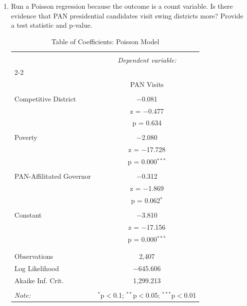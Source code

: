 \documentclass[12pt,letterpaper]{article}
\begin{document}
\begin{enumerate}
	\item [(a)]
	Run a Poisson regression because the outcome is a count variable. Is there evidence that PAN presidential candidates visit swing districts more? Provide a test statistic and p-value.
	
	
	
\begin{table}[!htbp] \centering 
	\caption{Table of Coefficients: Poisson Model} 
	\label{} 
	\begin{tabular}{@{\extracolsep{5pt}}lc} 
		\\[-1.8ex]\hline 
		\hline \\[-1.8ex] 
		& \multicolumn{1}{c}{\textit{Dependent variable:}} \\ 
		\cline{2-2} 
		\\[-1.8ex] & PAN Visits \\ 
		\hline \\[-1.8ex] 
		Competitive District & $-$0.081 \\ 
		& z = $-$0.477 \\ 
		& p = 0.634 \\ 
		& \\ 
		Poverty & $-$2.080 \\ 
		& z = $-$17.728 \\ 
		& p = 0.000$^{***}$ \\ 
		& \\ 
		PAN-Affilitated Governor & $-$0.312 \\ 
		& z = $-$1.869 \\ 
		& p = 0.062$^{*}$ \\ 
		& \\ 
		Constant & $-$3.810 \\ 
		& z = $-$17.156 \\ 
		& p = 0.000$^{***}$ \\ 
		& \\ 
		\hline \\[-1.8ex] 
		Observations & 2,407 \\ 
		Log Likelihood & $-$645.606 \\ 
		Akaike Inf. Crit. & 1,299.213 \\ 
		\hline 
		\hline \\[-1.8ex] 
		\textit{Note:}  & \multicolumn{1}{r}{$^{*}$p$<$0.1; $^{**}$p$<$0.05; $^{***}$p$<$0.01} \\ 
	\end{tabular} 
\end{table} 


\end{enumerate}
\end{document}

